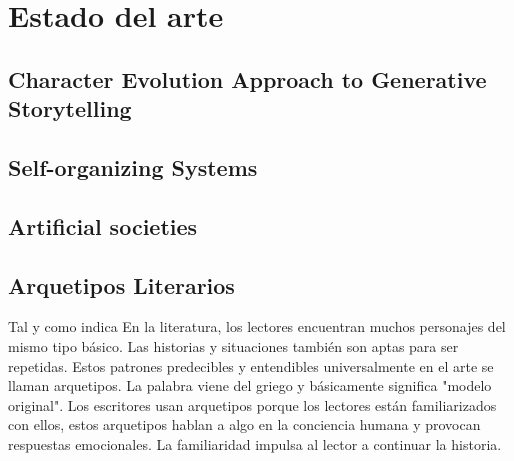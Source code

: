 
\chapter{Estado del arte}
\label{cha:Estado del arte}


\section{Character Evolution Approach to Generative Storytelling}


\section{Self-organizing Systems}


\section{Artificial societies}



\section{Arquetipos Literarios}

Tal y como indica \cite{web_arquetipos} En la literatura, los lectores encuentran muchos personajes del mismo tipo básico. Las historias y situaciones también son aptas para ser repetidas. Estos patrones predecibles y entendibles universalmente en el arte se llaman arquetipos. La palabra viene del griego y básicamente significa "modelo original". Los escritores usan arquetipos porque los lectores están familiarizados con ellos, estos arquetipos hablan a algo en la conciencia humana y provocan respuestas emocionales. La familiaridad impulsa al lector a continuar la historia.
